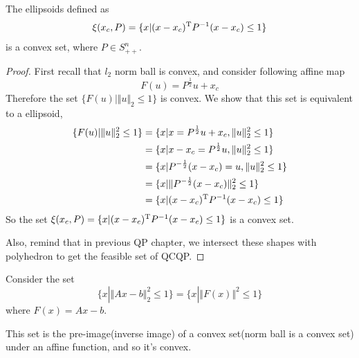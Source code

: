 \begin{example}
The ellipsoids defined as
\begin{equation*}
\xi(x_c, P) =\{x|(x - x_c)^{{\rm T}}P^{-1}(x - x_c) \leq 1 \}
\end{equation*}
is a convex set, where $P\in S^n_{++}$.

\begin{proof}
	First recall that $l_2$ norm ball is convex, and consider following affine map
	$$F(u) = P^{\frac{1}{2}}u + x_c$$
	Therefore the set $\{F(u) | \Vert u\Vert_2 \leq 1 \}$ is convex. We show that this set is equivalent to a ellipsoid,
\begin{align*}
\{F(u) | \Vert u\Vert^2_2 \leq 1 \} &= \{x|x = P^{\frac{1}{2}}u+x_c, \Vert u\Vert^2_2 \leq 1 \}\\
&= \{x|x - x_c = P^{\frac{1}{2}}u, \Vert u\Vert^2_2 \leq 1 \}\\
&= \{x|P^{-\frac{1}{2}}(x - x_c) =u, \Vert u\Vert^2_2 \leq 1 \}\\
&= \{x|\Vert P^{-\frac{1}{2}}(x - x_c)\Vert^2_2 \leq 1 \}\\
&= \{x|(x - x_c)^{{\rm T}}P^{-1}(x - x_c) \leq 1 \}
\end{align*}
So the set $\xi(x_c, P) =\{x|(x - x_c)^{{\rm T}}P^{-1}(x - x_c) \leq 1 \}$ is a convex set.

Also, remind that in previous QP chapter, we intersect these shapes with polyhedron to get the feasible set of QCQP.
\end{proof}
\end{example}

\begin{example}Consider the set
	$$\{x | \Vert Ax - b \Vert^2_2 \leq 1 \} = \{x | \Vert F(x) \Vert^2 \leq 1 \}$$
	where $F(x) = Ax - b$.

	This set is the pre-image(inverse image) of a convex set(norm ball is a convex set) under an affine function, and so it's convex.
\end{example}




